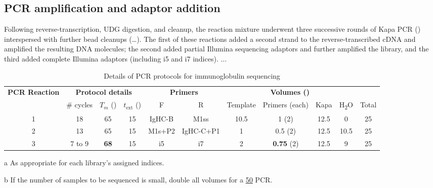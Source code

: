 
\subsection{PCR amplification and adaptor addition} 
\label{sec:methods_molec_igseq_pcr}

Following reverse-transcription, UDG digestion, and cleanup, the reaction mixture underwent three successive rounds of Kapa PCR () interspersed with further bead cleanups (\dots). %
The first of these reactions added a second strand to the reverse-transcribed cDNA and amplified the resulting DNA molecules; the second added partial Illumina sequencing adaptors and further amplified the library, and the third added complete Illumina adaptors (including i5 and i7 indices). ...

\begin{table}[h]
\def\arraystretch{1.5}
\centering\small
\begin{threeparttable}
\caption{Details of PCR protocols for \Nfu immunoglobulin sequencing}
\begin{tabular}{c|ccc|cc|ccccc}\toprule
\multirow{2}{*}{\textbf{PCR Reaction}} & \multicolumn{3}{c|}{\textbf{Protocol details}} & \multicolumn{2}{c|}{\textbf{Primers}} & \multicolumn{4}{c}{\textbf{Volumes (\ul{})}}\\
 & \# cycles & $T_m$ (\degC{}) & $t_\mathrm{ext}$ (\secs{}) & F & R & Template & Primers (each) & Kapa & H\textsubscript{2}O & Total \\\midrule
1 & 18 & 65 & 15 & IgHC-B & M1ss & 10.5 & 1 (\x{}2) & 12.5 & 0 & 25 \\\midrule
2 & 13 & 65 & 15 & M1s+P2 & IgHC-C+P1 & 1 & 0.5 (\x{}2) & 12.5 & 10.5 & 25 \\\midrule
3 & 7 to 9 & \textbf{68} & 15 & i5\tnote{a} & i7\tnote{a} & 2 & \textbf{0.75} (\x{}2) & 12.5 & 9 & 25\tnote{b} \\
\bottomrule
\end{tabular}
\begin{tablenotes}
\item[a] As appropriate for each library's assigned indices.
\item[b] If the number of samples to be sequenced is small, double all volumes for a \ul{50} PCR.
\end{tablenotes}
\label{tab:pcr}
\end{threeparttable}
\end{table}

